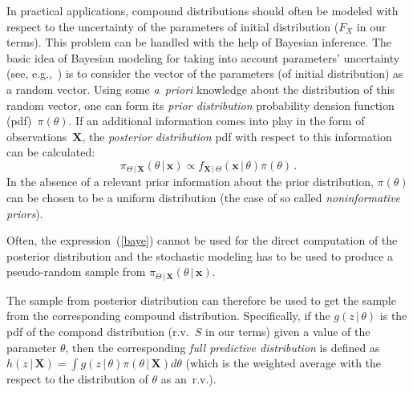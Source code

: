 \begin{multicols}{2}
\noindent
In practical applications, compound distributions should often be
modeled with respect to the uncertainty of the parameters of
initial distribution ($F_X$ in our terms). This problem can be
handled with the help of Bayesian inference. The basic idea of
Bayesian modeling for taking into account parameters' uncertainty
(see, e.g.,~\cite{Shev4}) is to consider the vector of the
parameters (of initial distribution) as a random vector. Using
some \textit{a~priori} knowledge about the distribution of this random
vector, one can form its {\it prior distribution} probability dension function (pdf)~$\pi(\theta)$.
If an additional information comes into play in the
form of observations~$\mathbf{X}$, the {\it posterior
distribution} pdf with respect to this information can be
calculated:
\begin{equation}
\label{baye}
\pi_{\Theta\,|\,\mathbf{X}}(\theta\,|\,\mathbf{x})\propto f_{\mathbf{X}\,|\,\Theta}
(\mathbf{x}\,|\,\theta)\pi(\theta)\,.
\end{equation}
In the absence of a relevant prior information about the prior distribution,
 $\pi(\theta)$ can be chosen to be a uniform distribution (the case of
 so called {\it noninformative priors}).

Often, the expression~(\ref{baye}) cannot be used for the direct computation
of the posterior distribution and the stochastic modeling has to be used
to produce a pseudo-random sample from $\pi_{\Theta\,|\,\mathbf{X}}(\theta\,|\,\mathbf{x})$.


The sample from posterior distribution can therefore be used to
get the sample from the corresponding compound distribution.
Specifically, if the $g(z\,|\,\theta)$ is the pdf of the compond
distribution (r.v.~$S$ in our terms) given a value of the
parameter $\theta$, then the corresponding {\it full predictive
distribution} is defined as $h(z\,|\,\mathbf{X})=\int
g(z\,|\,\theta)\pi(\theta\,|\,\mathbf{X})d\theta$ (which
is the weighted average with the respect to the distribution of
$\theta$ as an~r.v.).


\end{multicols}

